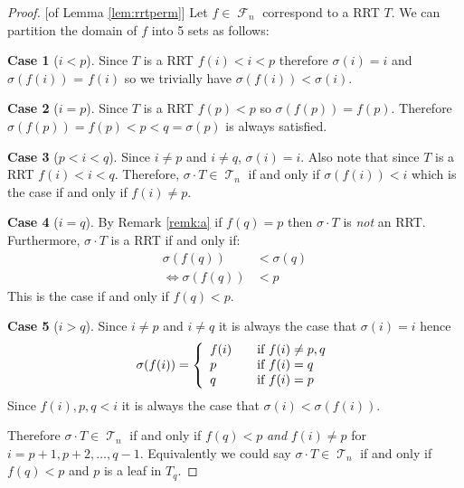 \documentclass[10pt]{amsart} %
\theoremstyle{definition}
\newtheorem{case}{Case}
\DeclareMathOperator{\T}{\mathcal{T}}
\DeclareMathOperator{\F}{\mathcal{F}}
\begin{document}
\begin{proof}{[of Lemma \ref{lem:rrtperm}]}  
Let $f \in \F_n$ correspond to a RRT $T$.  We can partition the domain of $f$ into 5 sets as follows: 
\begin{case}[$i<p$]
Since $T$ is a RRT $f(i) < i < p$ therefore $\sigma(i) = i$ and $\sigma(f(i))$ = $f(i)$ so we trivially have $\sigma(f(i)) < \sigma(i)$.
\end{case}
\begin{case}[$i=p$]
Since $T$ is a RRT $f(p) < p$ so $\sigma(f(p)) = f(p)$.  Therefore $\sigma(f(p)) = f(p) < p < q  = \sigma(p)$ is always satisfied.
\end{case}
\begin{case}[$p<i<q$]
 Since $i \neq p$ and $i \neq q$,  $\sigma(i) = i$. Also note that since $T$ is a RRT $f(i) < i < q$.  Therefore, $\sigma \cdot T \in \T_n$ if and only if $\sigma(f(i)) < i$ which is the case if and only if $f(i) \neq p$.   
\end{case}
\begin{case}[$i=q$]
 By Remark \ref{remk:a} if $f(q) = p$ then $\sigma \cdot T$ is \emph{not} an RRT.  
 Furthermore, $\sigma \cdot T$ is a RRT if and only if:
 \begin{align*}
  \sigma(f(q)) &< \sigma(q)  \\
  \iff \sigma(f(q)) &< p
 \end{align*}
This is the case if and only if $f(q) <p$.
\end{case}
\begin{case}[$i>q$]
Since $i \neq p$ and $i \neq q$ it is always the case that $\sigma(i) = i$ hence 
\[\sigma(f(i)) =
\left\{
  \begin{array}{l l}
    f(i) & \quad \text{if $f(i) \neq p,q$}\\
    p & \quad \text{if $f(i) = q$}\\
    q & \quad \text{if $f(i) = p$}
  \end{array} \right.\]
Since $f(i),p,q < i$ it is always the case that $\sigma(i) < \sigma(f(i))$.  
\end{case}
Therefore $\sigma \cdot T \in \T_n$ if and only if $f(q) < p $ \emph{and} $f(i) \neq p$ for $i = p+1,p+2,\dots,q-1$.  Equivalently we could say $\sigma \cdot T \in \T_n$ if and only if $f(q)< p$ and $p$ is a leaf in $T_q$. 
\end{proof}

\end{document}
